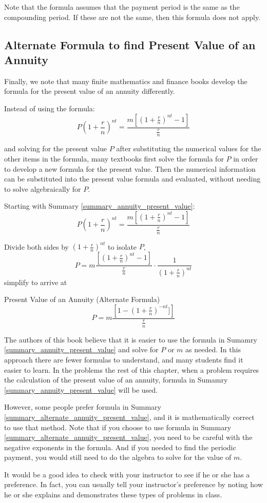 Note that the formula assumes that the payment period is the same as the compounding period. If these are not the same, then this formula does not apply.

\subsection{Alternate Formula to find Present Value of an Annuity}
Finally, we note that many finite mathematics and finance books develop the formula for the present value of an annuity differently.

Instead of using the formula:
\[
    P\left(1 + \frac{r}{n}\right)^{nt} = \frac{m[(1 +\frac{r}{n})^{nt} - 1]}{\frac{r}{n}}
\]

and solving for the present value \( P \) after substituting the numerical values for the other items in the formula, many textbooks first solve the formula for \( P \) in order to develop a new formula for the present value. Then the numerical information can be substituted into the present value formula and evaluated, without needing to solve algebraically for \( P \).

Starting with Summary \ref{summary_annuity_present_value}:
\[
    P\left(1 + \frac{r}{n}\right)^{nt} = \frac{m[(1 + \frac{r}{n})^{nt} - 1]}{\frac{r}{n}}
\]

Divide both sides by \((1+\frac{r}{n})^{nt}\) to isolate \( P \),
\[
    P = m\frac{\left[(1 + \frac{r}{n})^{nt} - 1\right]}{\frac{r}{n}}\cdot\frac{1}{(1 + \frac{r}{n})^{nt}}
\]
simplify to arrive at
\begin{summarybox}{Present Value of an Annuity (Alternate Formula)}\label{summary_alternate_annuity_present_value}
    \[
        P = m\frac{\left[1- (1 + \frac{r}{n})^{-nt}]\right]}{\frac{r}{n}}
    \]
\end{summarybox}

The authors of this book believe that it is easier to use the formula in Sumamry \ref{summary_annuity_present_value} and solve for \( P \) or \( m \) as needed. In this approach there are fewer formulas to understand, and many students find it easier to learn. In the problems the rest of this chapter, when a problem requires the calculation of the present value of an annuity, formula in Sumamry \ref{summary_annuity_present_value} will be used.

However, some people prefer formula in Summary \ref{summary_alternate_annuity_present_value}, and it is mathematically correct to use that method. Note that if you choose to use formula in Summary \ref{summary_alternate_annuity_present_value}, you need to be careful with the negative exponents in the formula. And if you needed to find the periodic payment, you would still need to do the algebra to solve for the value of \( m \).

It would be a good idea to check with your instructor to see if he or she has a preference. In fact, you can usually tell your instructor’s preference by noting how he or she explains and demonstrates these types of problems in class.
